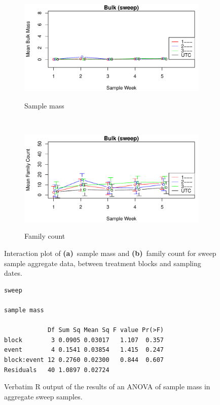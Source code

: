\documentclass[10pt,letterpaper,twocolumn]{article}
\begin{document}
\begin{figure}[h]
	\centering
	\begin{subfigure}[b]{0.45\textwidth}
		\caption{Sample mass}
		\includegraphics[width=\textwidth]{plots/bulk/2015_mass_sweep_interplot.pdf}
		\label{fig:bulk_sweep_mass_interplot}
	\end{subfigure}
	~
	\begin{subfigure}[b]{0.45\textwidth}
		\caption{Family count}
		\includegraphics[width=\textwidth]{plots/bulk/2015_family_sweep_interplot.pdf}
		\label{fig:bulk_sweep_family_interplot}
	\end{subfigure}
	\caption{Interaction plot of \textbf{(a)}~sample mass and \textbf{(b)}~family count for sweep sample aggregate data, between treatment blocks and sampling dates.}
	\label{fig:bulk_sweep_interplot}
	\smallskip
	\nointerlineskip
	\hrulefill
\end{figure}

\begin{figure}[h]
	\lstset{numbers=left}
	\lstset{xleftmargin=5mm,framexleftmargin=5mm}
	\begin{lstlisting}
sweep 

sample mass 

            Df Sum Sq Mean Sq F value Pr(>F)
block        3 0.0905 0.03017   1.107  0.357
event        4 0.1541 0.03854   1.415  0.247
block:event 12 0.2760 0.02300   0.844  0.607
Residuals   40 1.0897 0.02724               
	\end{lstlisting}
	\caption{Verbatim R output of the results of an ANOVA of sample mass in aggregate sweep samples.}
	\label{fig:bulk_sweep_mass_anova}
	\smallskip
	\nointerlineskip
	\hrulefill
\end{figure}
\end{document}
